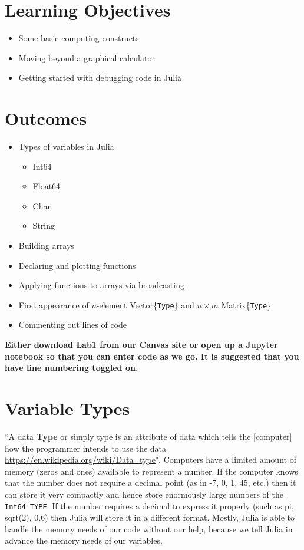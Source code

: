 
\section*{Learning Objectives}

\begin{itemize}
\item  Some basic computing constructs
\item  Moving beyond a graphical calculator
\item Getting started with debugging code in Julia
\end{itemize}

\section*{Outcomes} 
\begin{itemize}
\item Types of variables in Julia
\begin{itemize}
    \item Int64
    \item Float64
    \item Char
    \item String
    \end{itemize}
\item Building arrays
\item Declaring and plotting functions
\item Applying functions to arrays via broadcasting
\item First appearance of $n$-element Vector\{\texttt{Type}\} and $n \times m$
Matrix\{\texttt{Type}\}
\item Commenting out lines of code
\end{itemize}

\vspace*{1cm}

\textbf{Either download Lab1 from our Canvas site or open up a Jupyter notebook so that you can enter code as we go. It is suggested that you have line numbering toggled on.}  

\newpage

\section{Variable Types}

``A data \textbf{Type} or simply type is an attribute of data which tells the [computer] how the programmer intends to use the data \url{https://en.wikipedia.org/wiki/Data_type}". Computers have a limited amount of memory (zeros and ones) available to represent a number. If the computer knows that the number does not require a decimal point (as in -7, 0, 1, 45, etc,) then it can store it very compactly and hence store enormously large numbers of the \texttt{Int64 TYPE}. If the number requires a decimal to express it properly (such as pi, sqrt(2), 0.6) then Julia will store it in a different format. Mostly, Julia is able to handle the memory needs of our code without our help, because we tell Julia in advance the memory needs of our variables. \\

